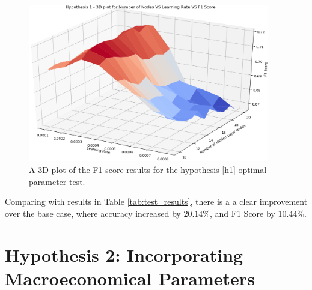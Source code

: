 \documentclass{UoYCSproject}
\begin{document}
\begin{figure}[h]
\includegraphics[width=10.5cm]{h1_f1.png}
\centering
\caption{A 3D plot of the F1 score results for the hypothesis \ref{h1} optimal parameter test.} 
\label{fig:h1_plot_f1}
\end{figure}

Comparing with results in Table \ref{tab:test_results}, there is a a clear improvement over the base case, where accuracy increased by $20.14$\%, and F1 Score by $10.44$\%. 

\section{Hypothesis 2: Incorporating Macroeconomical Parameters}
\end{document}

